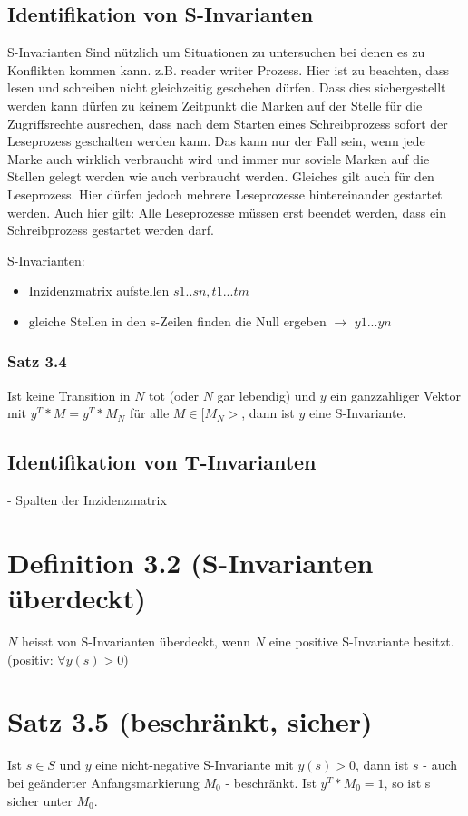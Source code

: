 \documentclass[12pt]{scrreprt}
\begin{document}
\subsection{Identifikation von S-Invarianten}
S-Invarianten Sind nützlich um Situationen zu untersuchen bei denen es zu Konflikten kommen kann. z.B. reader writer Prozess. Hier ist zu beachten, dass lesen und schreiben nicht gleichzeitig geschehen dürfen. Dass dies sichergestellt werden kann dürfen zu keinem Zeitpunkt die Marken auf der Stelle für die Zugriffsrechte ausrechen, dass nach dem Starten eines Schreibprozess sofort der Leseprozess geschalten werden kann. Das kann nur der Fall sein, wenn jede Marke auch wirklich verbraucht wird und immer nur soviele Marken auf die Stellen gelegt werden wie auch verbraucht werden. Gleiches gilt auch für den Leseprozess. Hier dürfen jedoch mehrere Leseprozesse hintereinander gestartet werden. Auch hier gilt: Alle Leseprozesse müssen erst beendet werden, dass ein Schreibprozess gestartet werden darf.\newline

S-Invarianten:
\begin{itemize}
\item Inzidenzmatrix aufstellen $s1..sn, t1...tm$
\item gleiche Stellen in den s-Zeilen finden die Null ergeben $\rightarrow$ $y1...yn$
\end{itemize}

\subsubsection*{Satz 3.4}
Ist keine Transition in $N$ tot (oder $N$ gar lebendig) und $y$ ein ganzzahliger Vektor mit $y^{T} * M = y^{T} * M_{N}$ für alle $M \in [M_{N}>$, dann ist $y$ eine S-Invariante.\newline

\subsection*{Identifikation von T-Invarianten}
- Spalten der Inzidenzmatrix

\section*{Definition 3.2 (S-Invarianten überdeckt)}
$N$ heisst von S-Invarianten überdeckt, wenn $N$ eine positive S-Invariante besitzt. (positiv: $\forall y(s) > 0$)

\section*{Satz 3.5 (beschränkt, sicher)}
Ist $s \in S$ und $y$ eine nicht-negative S-Invariante mit $y(s) > 0$, dann ist $s$ - auch bei geänderter Anfangsmarkierung $M_{0}$ - beschränkt. Ist $y^{T} * M_{0} = 1$, so ist s sicher unter $M_{0}$.
\end{document}
